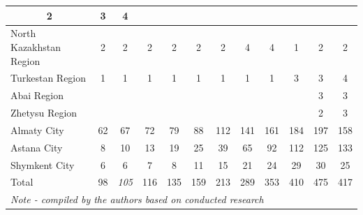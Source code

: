 \begin{table}[H]
{\begin{tabular}{|lccccccccccc|}
  \multicolumn{1}{c|}{2} &
  \multicolumn{1}{c|}{3} &
  4 \\ \hline
\multicolumn{1}{|l|}{North Kazakhstan Region} &
  \multicolumn{1}{c|}{2} &
  \multicolumn{1}{c|}{2} &
  \multicolumn{1}{c|}{2} &
  \multicolumn{1}{c|}{2} &
  \multicolumn{1}{c|}{2} &
  \multicolumn{1}{c|}{2} &
  \multicolumn{1}{c|}{4} &
  \multicolumn{1}{c|}{4} &
  \multicolumn{1}{c|}{1} &
  \multicolumn{1}{c|}{2} &
  2 \\ \hline
\multicolumn{1}{|l|}{Turkestan Region} &
  \multicolumn{1}{c|}{1} &
  \multicolumn{1}{c|}{1} &
  \multicolumn{1}{c|}{1} &
  \multicolumn{1}{c|}{1} &
  \multicolumn{1}{c|}{1} &
  \multicolumn{1}{c|}{1} &
  \multicolumn{1}{c|}{1} &
  \multicolumn{1}{c|}{1} &
  \multicolumn{1}{c|}{3} &
  \multicolumn{1}{c|}{3} &
  4 \\ \hline
\multicolumn{1}{|l|}{Abai Region} &
  \multicolumn{1}{c|}{} &
  \multicolumn{1}{c|}{} &
  \multicolumn{1}{c|}{} &
  \multicolumn{1}{c|}{} &
  \multicolumn{1}{c|}{} &
  \multicolumn{1}{c|}{} &
  \multicolumn{1}{c|}{} &
  \multicolumn{1}{c|}{} &
  \multicolumn{1}{c|}{} &
  \multicolumn{1}{c|}{3} &
  3 \\ \hline
\multicolumn{1}{|l|}{Zhetysu Region} &
  \multicolumn{1}{c|}{} &
  \multicolumn{1}{c|}{} &
  \multicolumn{1}{c|}{} &
  \multicolumn{1}{c|}{} &
  \multicolumn{1}{c|}{} &
  \multicolumn{1}{c|}{} &
  \multicolumn{1}{c|}{} &
  \multicolumn{1}{c|}{} &
  \multicolumn{1}{c|}{} &
  \multicolumn{1}{c|}{2} &
  3 \\ \hline
\multicolumn{1}{|l|}{Almaty City} &
  \multicolumn{1}{c|}{62} &
  \multicolumn{1}{c|}{67} &
  \multicolumn{1}{c|}{72} &
  \multicolumn{1}{c|}{79} &
  \multicolumn{1}{c|}{88} &
  \multicolumn{1}{c|}{112} &
  \multicolumn{1}{c|}{141} &
  \multicolumn{1}{c|}{161} &
  \multicolumn{1}{c|}{184} &
  \multicolumn{1}{c|}{197} &
  158 \\ \hline
\multicolumn{1}{|l|}{Astana City} &
  \multicolumn{1}{c|}{8} &
  \multicolumn{1}{c|}{10} &
  \multicolumn{1}{c|}{13} &
  \multicolumn{1}{c|}{19} &
  \multicolumn{1}{c|}{25} &
  \multicolumn{1}{c|}{39} &
  \multicolumn{1}{c|}{65} &
  \multicolumn{1}{c|}{92} &
  \multicolumn{1}{c|}{112} &
  \multicolumn{1}{c|}{125} &
  133 \\ \hline
\multicolumn{1}{|l|}{Shymkent City} &
  \multicolumn{1}{c|}{6} &
  \multicolumn{1}{c|}{6} &
  \multicolumn{1}{c|}{7} &
  \multicolumn{1}{c|}{8} &
  \multicolumn{1}{c|}{11} &
  \multicolumn{1}{c|}{15} &
  \multicolumn{1}{c|}{21} &
  \multicolumn{1}{c|}{24} &
  \multicolumn{1}{c|}{29} &
  \multicolumn{1}{c|}{30} &
  25 \\ \hline
\multicolumn{1}{|l|}{Total} &
  \multicolumn{1}{c|}{98} &
  \multicolumn{1}{c|}{\textit{105}} &
  \multicolumn{1}{c|}{116} &
  \multicolumn{1}{c|}{135} &
  \multicolumn{1}{c|}{159} &
  \multicolumn{1}{c|}{213} &
  \multicolumn{1}{c|}{289} &
  \multicolumn{1}{c|}{353} &
  \multicolumn{1}{c|}{410} &
  \multicolumn{1}{c|}{475} &
  417 \\ \hline
\multicolumn{12}{|l|}{\textit{Note - compiled by the authors based on conducted research}} \\ \hline
\end{tabular}}
\end{table}


